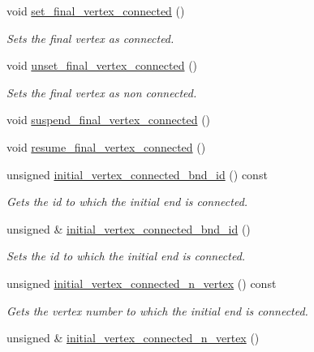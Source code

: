\begin{DoxyCompactItemize}
void \hyperlink{classoomph_1_1TriangleMeshCurveSection_abcdf60aacf4153498fe4dfa0821691d7}{set\+\_\+final\+\_\+vertex\+\_\+connected} ()
\begin{DoxyCompactList}\small\item\em Sets the final vertex as connected. \end{DoxyCompactList}\item 
void \hyperlink{classoomph_1_1TriangleMeshCurveSection_ac44effdfc3a04ba90668e7f3f54b248a}{unset\+\_\+final\+\_\+vertex\+\_\+connected} ()
\begin{DoxyCompactList}\small\item\em Sets the final vertex as non connected. \end{DoxyCompactList}\item 
void \hyperlink{classoomph_1_1TriangleMeshCurveSection_a379677086ad13d5cd7d0c5c669a37e2f}{suspend\+\_\+final\+\_\+vertex\+\_\+connected} ()
\item 
void \hyperlink{classoomph_1_1TriangleMeshCurveSection_a3c6277b6c1a1c6a5a6a7d234c4afc101}{resume\+\_\+final\+\_\+vertex\+\_\+connected} ()
\item 
unsigned \hyperlink{classoomph_1_1TriangleMeshCurveSection_aa20f1e54ff6f0f1ef0c550e0a2d119bb}{initial\+\_\+vertex\+\_\+connected\+\_\+bnd\+\_\+id} () const
\begin{DoxyCompactList}\small\item\em Gets the id to which the initial end is connected. \end{DoxyCompactList}\item 
unsigned \& \hyperlink{classoomph_1_1TriangleMeshCurveSection_a9e3e75c39655428e893ea740b6af30a7}{initial\+\_\+vertex\+\_\+connected\+\_\+bnd\+\_\+id} ()
\begin{DoxyCompactList}\small\item\em Sets the id to which the initial end is connected. \end{DoxyCompactList}\item 
unsigned \hyperlink{classoomph_1_1TriangleMeshCurveSection_a3c379a3eca49b36ece255290afea43fb}{initial\+\_\+vertex\+\_\+connected\+\_\+n\+\_\+vertex} () const
\begin{DoxyCompactList}\small\item\em Gets the vertex number to which the initial end is connected. \end{DoxyCompactList}\item 
unsigned \& \hyperlink{classoomph_1_1TriangleMeshCurveSection_ad718b449cea9bf93535cec6ca5b65a1a}{initial\+\_\+vertex\+\_\+connected\+\_\+n\+\_\+vertex} ()

\end{DoxyCompactItemize}
